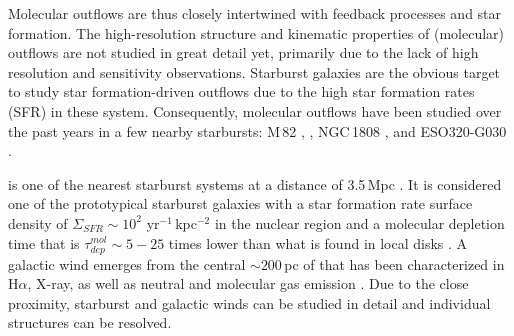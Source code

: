 Molecular outflows are thus closely intertwined with feedback processes and star formation. The high-resolution structure and kinematic properties of (molecular) outflows are not studied in great detail yet, primarily due to the lack of high resolution and sensitivity observations. Starburst galaxies are the obvious target to study star formation-driven outflows due to the high star formation rates (SFR) in these system. Consequently, molecular outflows have been studied over the past years in a few nearby starbursts: M\,82 \citep{2002ApJ...580L..21W,2015ApJ...814...83L},  \citep{2013Natur.499..450B,2017ApJ...835..265W,2018ApJ...867..111Z}, NGC\,1808 \citep{2018ApJ...856...97S}, and ESO320-G030 \citep{2016A&A...594A..81P}.

 is one of the nearest starburst systems at a distance of 3.5\,Mpc \citep{Rekola:2005ha}. It is considered one of the prototypical starburst galaxies with a star formation rate surface density of $\Sigma_{SFR} \sim 10^2$\,\Msun\,yr$^{-1}$\,kpc$^{-2}$ in the nuclear region and a molecular depletion time that is $\tau^{mol}_{dep} \sim 5-25$ times lower than what is found in local disks \citep{Leroy:2015ds}. A galactic wind emerges from the central $\sim 200$\,pc of  that has been characterized in H$\alpha$, X-ray, as well as neutral and molecular gas emission \citep[e.g.][]{Sharp:2010jl,Turner:1985iy,Sturm:2011jb,Strickland:2000wd,Strickland:2002kp, Westmoquette:2011bp,2000ApJS..129..493H,2013Natur.499..450B,2017ApJ...835..265W}.
Due to the close proximity, starburst and galactic winds can be studied in detail and individual structures can be resolved.

